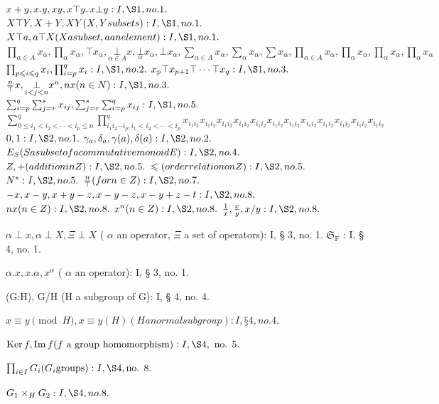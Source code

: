 
\(x + y, x.y, xy, x \top y, x \bot y: I, \S 1, no. 1.\) \(X \top Y, X + Y, XY (X, Y subsets): I, \S 1, no. 1.\) \(X \top a, a \top X (X a subset, a an element): I, \S 1, no. 1.\) \(\prod_{\alpha \in A} x_{\alpha}, \prod_{\alpha} x_{\alpha}, \top x_{\alpha}, \underset{\alpha \in A}{\bot} x, \underset{\alpha}{\bot} x_{\alpha}, \bot x_{\alpha}, \sum_{\alpha \in A} x_{\alpha}, \sum_{\alpha} x_{\alpha}, \sum x_{\alpha}, \prod_{\alpha \in A} x_{\alpha}, \prod_{\alpha} x_{\alpha}, \prod_{\alpha} x_{\alpha}, \prod_{\alpha} x_{\alpha}\) \(\prod_{p \leqslant i \leqslant q} x_i, \prod_{i=p}^q x_i: I, \S 1, no. 2.\) \(x_p \top x_{p+1} \top \cdots \top x_q: I, \S 1, no. 3.\) \(\frac{n}{\top} x, \underset{i < j < n}{\bot} x^n, nx (n \in N): I, \S 1, no. 3.\) \(\sum_{i=p}^{q} \sum_{j=r}^{s} x_{ij}, \sum_{j=r}^{s} \sum_{i=p}^{q} x_{ij}: I, \S 1, no. 5.\) \(\sum_{0 \leqslant i_1 < i_2 < \cdots < i_p \leqslant n} ^{q} \prod_{i_1 i_2 \cdots i_p, i_1 < i_2 < \cdots < i_p} ^{q} x_{i_1 i_2} x_{i_1 i_2} x_{i_1 i_2} x_{i_1 i_2} x_{i_1 i_2} x_{i_1 i_2} x_{i_1 i_2} x_{i_1 i_2} x_{i_1 i_2} x_{i_1 i_2} x_{i_1 i_2} x_{i_1 i_2}\) \(0, 1: I, \S 2, no. 1.\) \(\gamma_a, \delta_a, \gamma(a), \delta(a): I, \S 2, no. 2.\) \(E_S (S a subset of a commutative monoid E): I, \S 2, no. 4.\) \(Z, +(addition in Z): I, \S 2, no. 5.\) \(\leqslant (order relation on Z): I, \S 2, no. 5.\) \(N^*: I, \S 2, no. 5.\) \(\frac{n}{\top} (for n \in Z): I, \S 2, no. 7.\) \(-x, x - y, x + y - z, x - y - z, x - y + z - t: I, \S 2, no. 8.\) \(nx (n \in Z): I, \S 2, no. 8.\) \(x^n (n \in Z): I, \S 2, no. 8.\) \(\frac{1}{x}, \frac{x}{y}, x/y: I, \S 2, no. 8.\)

\(\alpha \perp x, \alpha \perp X, \Xi \perp X\) ( \(\alpha\) an operator, \(\Xi\) a set of operators): I, § 3, no. 1. \(\mathfrak{S}_{\mathrm{F}}\) : I, § 4, no. 1.

\(\alpha .x,x.\alpha ,x^{\alpha}\) ( \(\alpha\) an operator): I, § 3, no. 1.

(G:H), G/H (H a subgroup of G): I, § 4, no. 4.

\(x \equiv y \pmod{H}, x \equiv y (H) (H a normal subgroup): I, § 4, no. 4.\)

\(\operatorname{Ker} f, \operatorname{Im} f (f \text{ a group homomorphism}) : I, \S 4, \text{ no. } 5.\)

\(\prod_{i \in I} G_i (G_i \text{groups}) : I, \S 4, \text{no. } 8.\)

\(G_{1} \times_{H} G_{2}: I, \S 4, no. 8.\)


